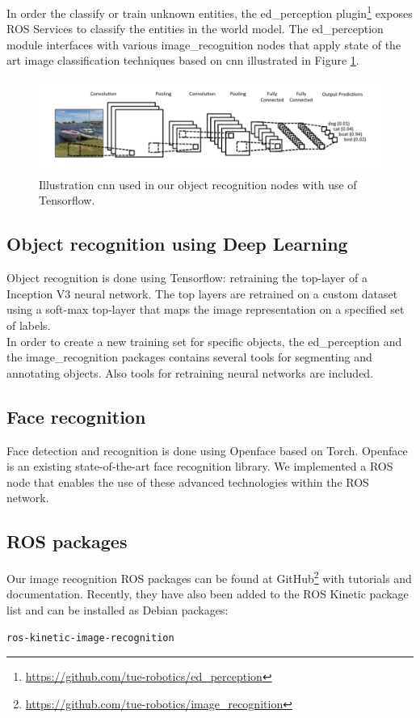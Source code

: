 In order the classify or train unknown entities, the ed\_perception plugin\footnote{\url{https://github.com/tue-robotics/ed_perception}} exposes ROS Services to classify the entities in the world model. The ed\_perception module interfaces with various image\_recognition nodes that apply state of the art image classification techniques based on \acrfull{cnn} illustrated in Figure \ref{fig:cnn}.
\begin{figure}[H]
    \centering
	\includegraphics[width = 1\linewidth]{Figures/cnn}
    \caption{Illustration \acrfull{cnn} used in our object recognition nodes with use of Tensorflow.}
	\label{fig:cnn}
\end{figure}

\subsection{Object recognition using Deep Learning}
Object recognition is done using Tensorflow: retraining the top-layer of a Inception V3 neural network. The top layers are retrained on a custom dataset using a soft-max top-layer that maps the image representation on a specified set of labels.
\\
In order to create a new training set for specific objects, the ed\_perception and the image\_recognition packages contains several tools for segmenting and annotating objects. Also tools for retraining neural networks are included.

\subsection{Face recognition}
Face detection and recognition is done using Openface based on Torch. Openface is an existing state-of-the-art face recognition library. We implemented a ROS node that enables the use of these advanced technologies within the ROS network.
\subsection{ROS packages}
Our image recognition ROS packages can be found at GitHub\footnote{\url{https://github.com/tue-robotics/image_recognition}} with tutorials and documentation. Recently, they have also been added to the ROS Kinetic package list and can be installed as Debian packages:
\begin{lstlisting}
ros-kinetic-image-recognition
\end{lstlisting}
